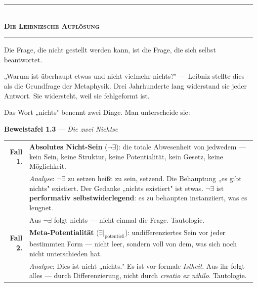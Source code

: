 \documentclass[10pt, openany, oneside]{book}
\renewcommand{\normalsize}{\fontsize{10}{13}\selectfont}
\begin{document}

\begin{center}
    \rule{0.3\textwidth}{0.4pt}\\[0.5em]
    {\normalsize\bfseries\scshape Die Leibnizsche Auflösung}\\[0.3em]
    \rule{0.3\textwidth}{0.4pt}
\end{center}

\vspace{1em}

\noindent Die Frage, die nicht gestellt werden kann, ist die Frage, die sich selbst beantwortet.

„Warum ist überhaupt etwas und nicht vielmehr nichts?" --- Leibniz stellte dies als die Grundfrage der Metaphysik. Drei Jahrhunderte lang widerstand sie jeder Antwort. Sie widersteht, weil sie fehlgeformt ist.

Das Wort „nichts" benennt zwei Dinge. Man unterscheide sie:

\vspace{0.5em}

\textbf{Beweistafel 1.3} --- \textit{Die zwei Nichtse}

\vspace{0.5em}

\noindent\begin{tabular}{r p{}}
\textbf{Fall 1.} & \textbf{Absolutes Nicht-Sein} ($\neg\exists$): die totale Abwesenheit von jedwedem --- kein Sein, keine Struktur, keine Potentialität, kein Gesetz, keine Möglichkeit. \\[0.3em]
 & \textit{Analyse}: $\neg\exists$ zu setzen heißt zu sein, setzend. Die Behauptung „es gibt nichts" existiert. Der Gedanke „nichts existiert" ist etwas. $\neg\exists$ ist \textbf{performativ selbstwiderlegend}: es zu behaupten instanziiert, was es leugnet. \\[0.3em]
 & Aus $\neg\exists$ folgt nichts --- nicht einmal die Frage. Tautologie. \\[0.5em]
\textbf{Fall 2.} & \textbf{Meta-Potentialität} ($\exists|_{\text{potentiell}}$): undifferenziertes Sein vor jeder bestimmten Form --- nicht leer, sondern voll von dem, was sich noch nicht unterschieden hat. \\[0.3em]
 & \textit{Analyse}: Dies ist nicht „nichts." Es ist vor-formale \textit{Istheit}. Aus ihr folgt alles --- durch Differenzierung, nicht durch \textit{creatio ex nihilo}. Tautologie. \\[0.3em]
\end{tabular}
\end{document}
